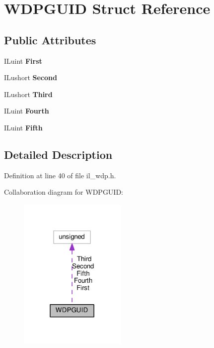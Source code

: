 \hypertarget{structWDPGUID}{}\section{W\+D\+P\+G\+U\+ID Struct Reference}
\label{structWDPGUID}
\subsection*{Public Attributes}
\begin{DoxyCompactItemize}
\item 
\mbox{\label{structWDPGUID_a519e179fe96fe01b016182388ee98d3b}} 
I\+Luint {\bfseries First}
\item 
\mbox{\label{structWDPGUID_a620816955d346a213b2239420a3ea8d4}} 
I\+Lushort {\bfseries Second}
\item 
\mbox{\label{structWDPGUID_a71b6f7b13e0b5005208d1f39a709dab5}} 
I\+Lushort {\bfseries Third}
\item 
\mbox{\label{structWDPGUID_a3e36a82699c8614c2ec5d6003c03649a}} 
I\+Luint {\bfseries Fourth}
\item 
\mbox{\label{structWDPGUID_ae0938c5dafa22e7014bcaa58dc6ed553}} 
I\+Luint {\bfseries Fifth}
\end{DoxyCompactItemize}


\subsection{Detailed Description}


Definition at line 40 of file il\+\_\+wdp.\+h.



Collaboration diagram for W\+D\+P\+G\+U\+ID\+:
\nopagebreak
\begin{figure}[H]
\begin{center}
\leavevmode
\includegraphics[width=147pt]{d8/dd7/structWDPGUID__coll__graph}
\end{center}
\end{figure}


